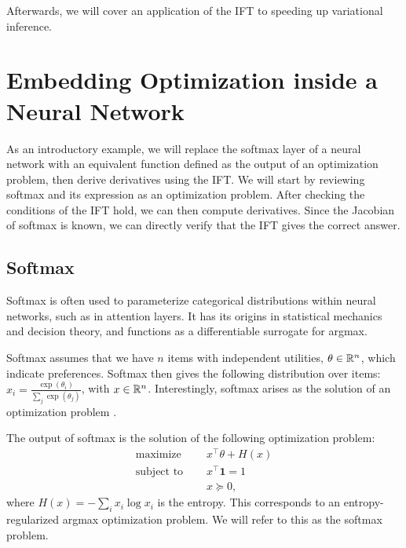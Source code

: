 \documentclass[11pt]{article}
\begin{document}
Afterwards, we will cover an application of the IFT to speeding up variational inference.

\section{Embedding Optimization inside a Neural Network}
As an introductory example,
we will replace the softmax layer of a neural network with an equivalent function
defined as the output of an optimization problem, then derive derivatives using the IFT.
We will start by reviewing softmax and its expression as an optimization problem.
After checking the conditions of the IFT hold, we can then compute derivatives.
Since the Jacobian of softmax is known, we can directly verify that the IFT gives
the correct answer.

\subsection{Softmax}
Softmax is often used to parameterize categorical distributions within neural networks,
such as in attention layers.
It has its origins in statistical mechanics and decision theory, and functions
as a differentiable surrogate for argmax.

Softmax assumes that we have $n$ items with independent utilities, $\theta \in \mathbb{R}^n$,
which indicate preferences.
Softmax then gives the following distribution over items:
$x_i = \frac{\exp(\theta_i)}{\sum_j \exp(\theta_j)}$, with $x\in\mathbb{R}^n$.
Interestingly, softmax arises as the solution of an optimization problem
\citep{gao2018properties}.

The output of softmax is the solution of the following optimization problem:
\begin{equation}
\label{eqn:softmax-opt}
\begin{aligned}
\textrm{maximize } \quad & x^\top\theta + H(x)\\
\textrm{subject to } \quad & x^\top \mathbf{1} = 1\\
& x \succeq 0,
\end{aligned}
\end{equation}
where $H(x) = -\sum_i x_i \log x_i$ is the entropy.
This corresponds to an entropy-regularized argmax optimization problem.
We will refer to this as the softmax problem.
\end{document}
